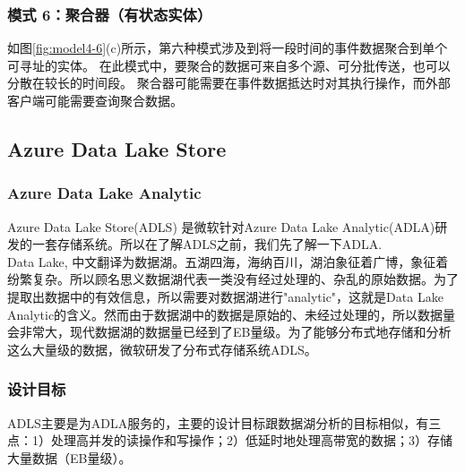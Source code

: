 \documentclass[11pt]{article}
\begin{document}
\subsubsection{模式 6：聚合器（有状态实体）}
如图\ref{fig:model4-6}(c)所示，第六种模式涉及到将一段时间的事件数据聚合到单个可寻址的实体。 在此模式中，要聚合的数据可来自多个源、可分批传送，也可以分散在较长的时间段。 聚合器可能需要在事件数据抵达时对其执行操作，而外部客户端可能需要查询聚合数据。

\subsection{Azure Data Lake Store}
\subsubsection{Azure Data Lake Analytic}
Azure Data Lake Store(ADLS) 是微软针对Azure Data Lake Analytic(ADLA)研发的一套存储系统。所以在了解ADLS之前，我们先了解一下ADLA.\\
Data Lake, 中文翻译为数据湖。五湖四海，海纳百川，湖泊象征着广博，象征着纷繁复杂。所以顾名思义数据湖代表一类没有经过处理的、杂乱的原始数据。为了提取出数据中的有效信息，所以需要对数据湖进行"analytic"，这就是Data Lake Analytic的含义。然而由于数据湖中的数据是原始的、未经过处理的，所以数据量会非常大，现代数据湖的数据量已经到了EB量级。为了能够分布式地存储和分析这么大量级的数据，微软研发了分布式存储系统ADLS。
\subsubsection{设计目标}
ADLS主要是为ADLA服务的，主要的设计目标跟数据湖分析的目标相似，有三点：1）处理高并发的读操作和写操作；2）低延时地处理高带宽的数据；3）存储大量数据（EB量级）。
\end{document}
